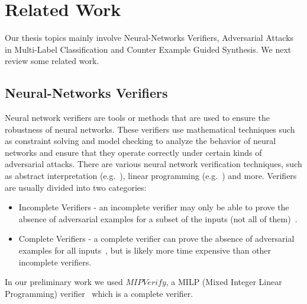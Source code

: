 
\section{Related Work}
Our thesis topics mainly involve Neural-Networks Verifiers, Adversarial Attacks in Multi-Label Classification and Counter Example Guided Synthesis.
We next review some related work.
\subsection{Neural-Networks Verifiers}
Neural network verifiers are tools or methods that are used to ensure the robustness of neural networks.
These verifiers use mathematical techniques such as constraint solving and model checking to analyze the behavior of neural networks and ensure that they operate correctly under certain kinds of adversarial attacks.
There are various neural network verification techniques, such as abstract interpretation (e.g.~\cite{ABSTRACTINTER, INCOMPLETE1}), linear programming (e.g.~\cite{MIPVERIFY}) and more.
Verifiers are usually divided into two categories:
\begin{itemize}
    \item Incomplete Verifiers - an incomplete verifier may only be able to prove the absence of adversarial examples for a subset of the inputs (not all of them)~\cite{INCOMPLETE1, INCOMPLETE2}.
    \item Complete Verifiers - a complete verifier can prove the absence of adversarial examples for all inputs~\cite{MIPVERIFY, COMPLETE}, but is likely more time expensive than other incomplete verifiers.
\end{itemize}
In our preliminary work we used $MIPVerify$, a MILP (Mixed Integer Linear Programming) verifier~\cite{MIPVERIFY} which is a complete verifier.

